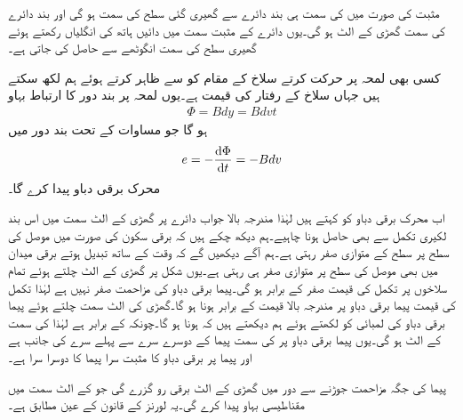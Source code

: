 مثبت  کی صورت میں  کی سمت ہی بند دائرے سے گھیری گئی سطح کی سمت ہو گی اور بند دائرے کی سمت گھڑی کے الٹ ہو گی۔یوں دائرے کے مثبت سمت میں دائیں ہاتھ کی انگلیاں رکھتے ہوئے گھیری سطح کی سمت انگوٹھے سے حاصل کی جاتی ہے۔ 

کسی بھی لمحہ  پر حرکت کرتے سلاخ کے مقام کو  سے ظاہر کرتے ہوئے ہم  لکھ سکتے ہیں جہاں  سلاخ کے رفتار کی قیمت ہے۔یوں لمحہ  پر بند دور کا ارتباط بہاو
\begin{align*}
\Phi=B d y =B d v t
\end{align*} 
ہو گا جو مساوات  کے تحت بند دور میں
\begin{align*}
e=-\frac{\dif \Phi}{\dif t}=-B d v
\end{align*}
محرک برقی دباو  پیدا کرے گا۔

اب محرک برقی دباو  کو کہتے ہیں لہٰذا مندرجہ بالا جواب دائرے پر گھڑی کے الٹ سمت میں اس بند لکیری تکمل سے بھی حاصل ہونا چاہیے۔ہم دیکھ چکے ہیں کہ برقی سکون کی صورت میں موصل کی سطح پر سطح کے متوازی  صفر رہتی ہے۔ہم آگے دیکھیں گے کہ وقت کے ساتھ تبدیل ہوتے برقی میدان میں بھی موصل کی سطح پر متوازی  صفر ہی رہتی ہے۔یوں شکل  پر گھڑی کے الٹ چلتے ہوئے تمام سلاخوں پر تکمل کی قیمت صفر کے برابر ہو گی۔پیما برقی دباو کی مزاحمت صفر نہیں ہے لہٰذا تکمل کی قیمت پیما برقی دباو پر مندرجہ بالا قیمت کے برابر ہونا ہو گا۔گھڑی کی الٹ سمت چلتے ہوئے پیما برقی دباو کی لمبائی کو  لکھتے ہوئے ہم دیکھتے ہیں کہ  ہونا ہو گا۔چونکہ  کے برابر ہے لہٰذا  کی سمت  کے الٹ ہو گی۔یوں پیما برقی دباو پر  کی سمت پیما کے دوسرے سرے سے پہلے سرے کی جانب ہے اور پیما پر برقی دباو کا مثبت سرا پیما کا دوسرا سرا ہے۔

پیما کی جگہ مزاحمت جوڑنے سے دور میں گھڑی کے الٹ برقی رو گزرے گی جو  کے الٹ سمت میں مقناطیسی بہاو پیدا کرے گی۔یہ لورنز کے قانون کے عین مطابق ہے۔

